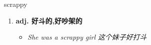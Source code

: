 
\begin{frame}
{\huge scrappy}
\begin{center}
\begin{enumerate}\Large
  \item \textbf{adj. 好斗的,好吵架的}
  \begin{itemize}
    \item \em{\Large{She was a scrappy girl 这个妹子好打斗}}
  \end{itemize}
\end{enumerate}
\end{center}
\end{frame}
